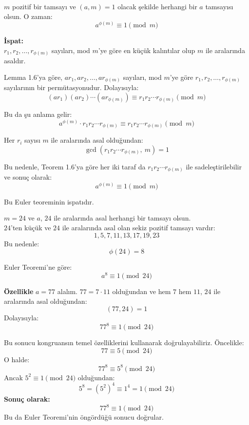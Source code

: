 \begin{tcolorbox}[colback=green!5, colframe=green!50!black, title=\textbf{Teorem 1.15 (Euler Teoremi)}, fonttitle=\bfseries, sharp corners]
$m$ pozitif bir tamsayı ve $(a, m) = 1$ olacak şekilde herhangi bir $a$ tamsayısı olsun. O zaman:
\[
a^{\phi(m)} \equiv 1 \pmod{m}
\]

\textbf{İspat:} \\
$r_1, r_2, \ldots, r_{\phi(m)}$ sayıları, mod $m$'ye göre en küçük kalıntılar olup $m$ ile aralarında asaldır.

Lemma 1.6'ya göre, $ar_1, ar_2, \ldots, ar_{\phi(m)}$ sayıları, mod $m$'ye göre $r_1, r_2, \ldots, r_{\phi(m)}$ sayılarının bir permütasyonudur. Dolayısıyla:
\[
(ar_1)(ar_2) \cdots (ar_{\phi(m)}) \equiv r_1 r_2 \cdots r_{\phi(m)} \pmod{m}
\]

Bu da şu anlama gelir:
\[
a^{\phi(m)} \cdot r_1 r_2 \cdots r_{\phi(m)} \equiv r_1 r_2 \cdots r_{\phi(m)} \pmod{m}
\]

Her $r_i$ sayısı $m$ ile aralarında asal olduğundan:
\[
\gcd(r_1 r_2 \cdots r_{\phi(m)},\ m) = 1
\]

Bu nedenle, Teorem 1.6'ya göre her iki taraf da $r_1 r_2 \cdots r_{\phi(m)}$ ile sadeleştirilebilir ve sonuç olarak:
\[
a^{\phi(m)} \equiv 1 \pmod{m}
\]

Bu Euler teoreminin ispatıdır.
\end{tcolorbox}

\vspace{2em}

\begin{tcolorbox}[colback=gray!5, colframe=gray!60!black, title=\textbf{Örnek 1.24: Euler Teoreminin Uygulaması}, fonttitle=\bfseries, sharp corners]

$m = 24$ ve $a$, $24$ ile aralarında asal herhangi bir tamsayı olsun. \\

$24$'ten küçük ve $24$ ile aralarında asal olan sekiz pozitif tamsayı vardır: 
\[
1, 5, 7, 11, 13, 17, 19, 23
\]
Bu nedenle:
\[
\phi(24) = 8
\]

Euler Teoremi'ne göre:
\[
a^8 \equiv 1 \pmod{24}
\]

\textbf{Özellikle} $a = 77$ alalım. $77 = 7 \cdot 11$ olduğundan ve hem $7$ hem $11$, $24$ ile aralarında asal olduğundan:
\[
(77, 24) = 1
\]
Dolayısıyla:
\[
77^8 \equiv 1 \pmod{24}
\]

Bu sonucu kongruansın temel özelliklerini kullanarak doğrulayabiliriz. Öncelikle:
\[
77 \equiv 5 \pmod{24}
\]
O halde:
\[
77^8 \equiv 5^8 \pmod{24}
\]
Ancak $5^2 \equiv 1 \pmod{24}$ olduğundan:
\[
5^8 = (5^2)^4 \equiv 1^4 = 1 \pmod{24}
\]
\textbf{Sonuç olarak:}
\[
77^8 \equiv 1 \pmod{24}
\]
Bu da Euler Teoremi'nin öngördüğü sonucu doğrular.
\end{tcolorbox}

